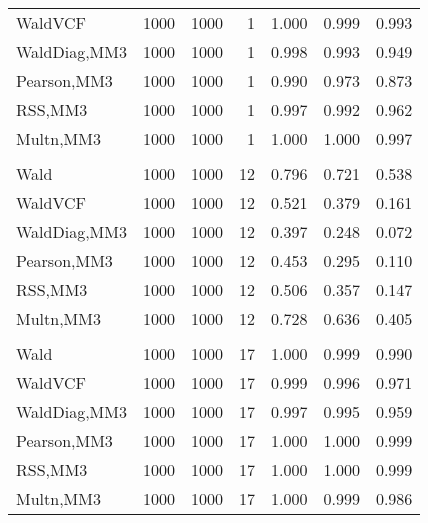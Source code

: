 \documentclass[
]{article}
\begin{document}
\begin{table}[H]
{\begin{tabular}[t]{lrrrrrr}
\hspace{1em}WaldVCF & 1000 & 1000 & 1 & 1.000 & 0.999 & 0.993\\
\hspace{1em}WaldDiag,MM3 & 1000 & 1000 & 1 & 0.998 & 0.993 & 0.949\\
\hspace{1em}Pearson,MM3 & 1000 & 1000 & 1 & 0.990 & 0.973 & 0.873\\
\hspace{1em}RSS,MM3 & 1000 & 1000 & 1 & 0.997 & 0.992 & 0.962\\
\hspace{1em}Multn,MM3 & 1000 & 1000 & 1 & 1.000 & 1.000 & 0.997\\
\addlinespace[0.3em]
\multicolumn{7}{l}{\textbf{2F 10V}}\\
\hspace{1em}Wald & 1000 & 1000 & 12 & 0.796 & 0.721 & 0.538\\
\hspace{1em}WaldVCF & 1000 & 1000 & 12 & 0.521 & 0.379 & 0.161\\
\hspace{1em}WaldDiag,MM3 & 1000 & 1000 & 12 & 0.397 & 0.248 & 0.072\\
\hspace{1em}Pearson,MM3 & 1000 & 1000 & 12 & 0.453 & 0.295 & 0.110\\
\hspace{1em}RSS,MM3 & 1000 & 1000 & 12 & 0.506 & 0.357 & 0.147\\
\hspace{1em}Multn,MM3 & 1000 & 1000 & 12 & 0.728 & 0.636 & 0.405\\
\addlinespace[0.3em]
\multicolumn{7}{l}{\textbf{3F 15V}}\\
\hspace{1em}Wald & 1000 & 1000 & 17 & 1.000 & 0.999 & 0.990\\
\hspace{1em}WaldVCF & 1000 & 1000 & 17 & 0.999 & 0.996 & 0.971\\
\hspace{1em}WaldDiag,MM3 & 1000 & 1000 & 17 & 0.997 & 0.995 & 0.959\\
\hspace{1em}Pearson,MM3 & 1000 & 1000 & 17 & 1.000 & 1.000 & 0.999\\
\hspace{1em}RSS,MM3 & 1000 & 1000 & 17 & 1.000 & 1.000 & 0.999\\
\hspace{1em}Multn,MM3 & 1000 & 1000 & 17 & 1.000 & 0.999 & 0.986\\
\bottomrule
\end{tabular}}
\endgroup{}
\end{table}
\end{document}
